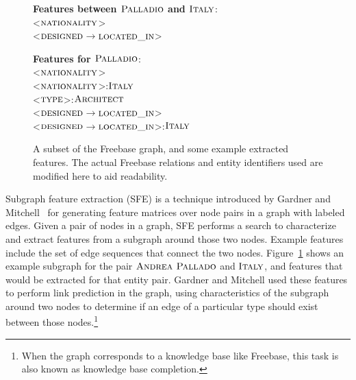 \documentclass[11pt]{article}
\newcommand{\figref}[1]{Figure~\ref{fig:#1}}
\newcommand{\formalpredicate}[1]{\ensuremath{\textsc{#1}}}
\newcommand{\entity}[1]{\ensuremath{\textsc{#1}}}
\begin{document}
\begin{figure}
  {\center
  }
  \textbf{Features between \entity{Palladio} and \entity{Italy}}:\\
  \textless\formalpredicate{nationality}\textgreater\\
  \textless\formalpredicate{designed}$\rightarrow$\formalpredicate{located\_in}\textgreater

  \textbf{Features for \entity{Palladio}}:\\
  \textless\formalpredicate{nationality}\textgreater\\
  \textless\formalpredicate{nationality}\textgreater:\entity{Italy}\\
  \textless\formalpredicate{type}\textgreater:\entity{Architect}\\
  \textless\formalpredicate{designed}$\rightarrow$\formalpredicate{located\_in}\textgreater \\
  \textless\formalpredicate{designed}$\rightarrow$\formalpredicate{located\_in}\textgreater:\entity{Italy}

  \caption{A subset of the Freebase graph, and some example extracted features.
  The actual Freebase relations and entity identifiers used are modified here
  to aid readability.}
  \label{fig:sfe}
\end{figure}

Subgraph feature extraction (SFE) is a technique introduced by Gardner and
Mitchell~ for generating feature matrices over node
pairs in a graph with labeled edges.  Given a pair of nodes in a graph, SFE
performs a search to characterize and extract features from a subgraph around
those two nodes.  Example features include the set of edge sequences that
connect the two nodes.  \figref{sfe} shows an example subgraph for the pair
\entity{Andrea Pallado} and \entity{Italy}, and features that would be
extracted for that entity pair.  Gardner and Mitchell used these features to
perform link prediction in the graph, using characteristics of the subgraph
around two nodes to determine if an edge of a particular type should exist
between those nodes.\footnote{When the graph corresponds to a knowledge base
like Freebase, this task is also known as knowledge base completion.}
\end{document}
